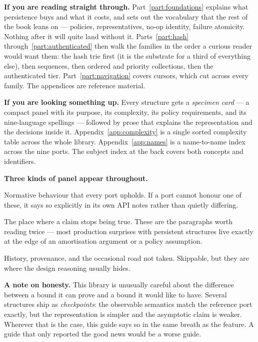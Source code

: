 \documentclass[11pt,twoside,openright]{book}
\begin{document}
\bigskip
\noindent\textbf{\sffamily\color{d7ink}If you are reading straight through.}
Part~\ref{part:foundations} explains what persistence buys and what it costs,
and sets out the vocabulary that the rest of the book leans on --- policies,
representatives, no-op identity, failure atomicity. Nothing after it will quite
land without it. Parts~\ref{part:hash} through~\ref{part:authenticated} then walk
the families in the order a curious reader would want them: the hash trie first
(it is the substrate for a third of everything else), then sequences, then
ordered and priority collections, then the authenticated tier. Part~\ref{part:navigation}
covers cursors, which cut across every family. The appendices are reference
material.

\bigskip
\noindent\textbf{\sffamily\color{d7ink}If you are looking something up.}
Every structure gets a \emph{specimen card} --- a compact panel with its purpose,
its complexity, its policy requirements, and its nine-language spellings ---
followed by prose that explains the representation and the decisions inside it.
Appendix~\ref{app:complexity} is a single sorted complexity table across the
whole library. Appendix~\ref{app:names} is a name-to-name index across the nine
ports. The subject index at the back covers both concepts and identifiers.

\bigskip
\noindent\textbf{\sffamily\color{d7ink}Three kinds of panel appear throughout.}

\begin{contractbox}
Normative behaviour that every port upholds. If a port cannot honour one of
these, it says so explicitly in its own API notes rather than quietly differing.
\end{contractbox}

\begin{caveatbox}[Caveat]
The place where a claim stops being true. These are the paragraphs worth reading
twice --- most production surprises with persistent structures live exactly at
the edge of an amortisation argument or a policy assumption.
\end{caveatbox}

\begin{asidebox}[Aside]
History, provenance, and the occasional road not taken. Skippable, but they are
where the design reasoning usually hides.
\end{asidebox}

\bigskip
\noindent\textbf{\sffamily\color{d7ink}A note on honesty.} This library is
unusually careful about the difference between a bound it can prove and a bound
it would like to have. Several structures ship as \emph{checkpoints}: the
observable semantics match the reference port exactly, but the representation is
simpler and the asymptotic claim is weaker. Wherever that is the case, this
guide says so in the same breath as the feature. A guide that only reported the
good news would be a worse guide.
\end{document}
